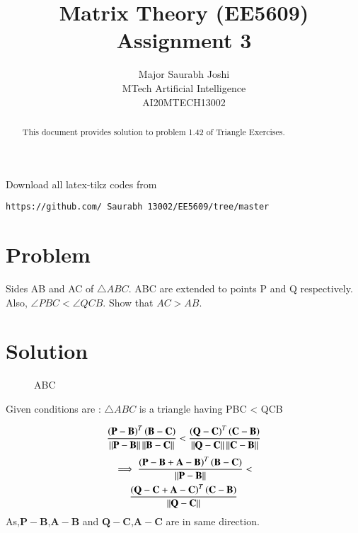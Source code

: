 \documentclass[journal,12pt,twocolumn]{IEEEtran}
\begin{document}
\makeatletter
{}
\makeatother
\let\StandardTheFigure\thefigure
\let\vec\mathbf
\renewcommand{\thefigure}{\theproblem}
\def\putbox#1#2#3{\makebox[0in][l]{\makebox[#1][l]{}\raisebox{\baselineskip}[0in][0in]{\raisebox{#2}[0in][0in]{#3}}}}
     \def\rightbox#1{\makebox[0in][r]{#1}}
     \def\centbox#1{\makebox[0in]{#1}}
     \def\topbox#1{\raisebox{-\baselineskip}[0in][0in]{#1}}
     \def\midbox#1{\raisebox{-0.5\baselineskip}[0in][0in]{#1}}
\vspace{3cm}
\title{Matrix Theory (EE5609) Assignment 3}
\author{Major Saurabh Joshi\\MTech Artificial Intelligence\\AI20MTECH13002}
\maketitle
\newpage
\bigskip
\renewcommand{\thefigure}{\theenumi}
\renewcommand{\thetable}{\theenumi}
\begin{abstract}
This  document provides solution to problem 1.42 of Triangle Exercises.
\end{abstract}
Download all latex-tikz codes from 
%
\begin{lstlisting}
https://github.com/ Saurabh 13002/EE5609/tree/master
\end{lstlisting}
%
\section{Problem}
Sides AB and AC of $\triangle{ABC}$. ABC are extended to points P and Q respectively.
Also, $\angle PBC < \angle QCB$. Show that $AC > AB$.
\section{ Solution}
\renewcommand{\thefigure}{1}
\begin{figure}[hb]
	\centering
	\centering
	\resizebox{\columnwidth}{!}{}
	\caption{\triangle ABC}
	\end{figure}
	
Given conditions are : $\triangle {ABC}$  is a triangle having \angle PBC < \angle QCB 

\begin{align}
\frac{\left( \vec{P - B} \right)^T  \left( \vec{B - C } \right)}{\norm{\vec{ P - B}} \norm{\vec{B - C}}}<\frac{\left( \vec{ Q - C} \right)^T  \left( \vec{C - B} \right)}{\norm{\vec{ Q - C}} \norm{\vec{C - B}}}
\end{align}
\begin{multline}\implies\frac{\left( \vec{P - B+A-B} \right)^T  \left( \vec{B - C } \right)}{\norm{\vec{ P - B}} }<\\\frac{\left( \vec{ Q - C+A-C} \right)^T  \left( \vec{C - B} \right)}{\norm{\vec{ Q - C}}}
\end{multline}
As,$\vec{ P - B}$,$\vec{ A - B}$ and $\vec{ Q - C}$,$\vec{ A - C}$ are in same direction.
\end{document}
